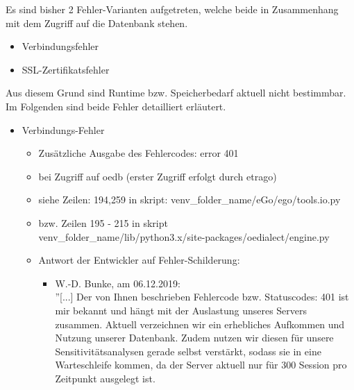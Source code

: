 \documentclass[
a4paper,     %
12pt         %
]{scrartcl}  %
\begin{document}
Es sind bisher 2 Fehler-Varianten aufgetreten, welche beide in Zusammenhang mit dem Zugriff auf die Datenbank stehen.
\begin{itemize}
	\item Verbindungsfehler
	\item SSL-Zertifikatsfehler
\end{itemize}
Aus diesem Grund sind Runtime bzw. Speicherbedarf aktuell nicht bestimmbar.\\

Im Folgenden sind beide Fehler detailliert erläutert.
\begin{itemize}
	\item Verbindungs-Fehler 
	\begin{itemize}
		\begin{lstlisting}
		Traceback (most recent call last):
		File "/home/dafu-vm/ego_venv/lib/python3.6/site-packages/sqlalchemy/pool.py", line 1122, in _do_get
		return self._pool.get(wait, self._timeout)
		File "/home/dafu-vm/ego_venv/lib/python3.6/site-packages/sqlalchemy/util/queue.py", line 145, in get
		raise Empty
		sqlalchemy.util.queue.Empty
		
		During handling of the above exception, another exception occurred:
		Traceback (most recent call last):
		...
		...
		File "/home/dafu-vm/ego_venv/lib/python3.6/site-packages/oedialect/engine.py", line 213, in post
		raise ConnectionException(json_response['reason'] if 'reason' in json_response else 'No reason returned')
		oedialect.engine.ConnectionException: No reason returned
		
		\end{lstlisting}
		\item Zusätzliche Ausgabe des Fehlercodes: error 401
		\item[] bei Zugriff auf oedb (erster Zugriff erfolgt durch etrago)
		\item siehe Zeilen: 194,259 in skript: venv\_folder\_name/eGo/ego/tools.io.py
		\item[] bzw. Zeilen 195 - 215 in skript\\ venv\_folder\_name/lib/python3.x/site-packages/oedialect/engine.py
		\item Antwort der Entwickler auf Fehler-Schilderung: 
		\begin{itemize}
			\item[]W.-D. Bunke, am 06.12.2019:\\''[...] Der von Ihnen beschrieben Fehlercode bzw. Statuscodes: 401 ist mir bekannt und hängt mit der Auslastung unseres Servers zusammen. Aktuell verzeichnen wir ein erhebliches Aufkommen und Nutzung unserer Datenbank. Zudem nutzen wir diesen für unsere Sensitivitätsanalysen gerade selbst verstärkt, sodass sie in eine Warteschleife kommen, da der Server aktuell nur für 300 Session pro Zeitpunkt ausgelegt ist.
			

\end{itemize}
\end{itemize}
\end{itemize}
\end{document}
